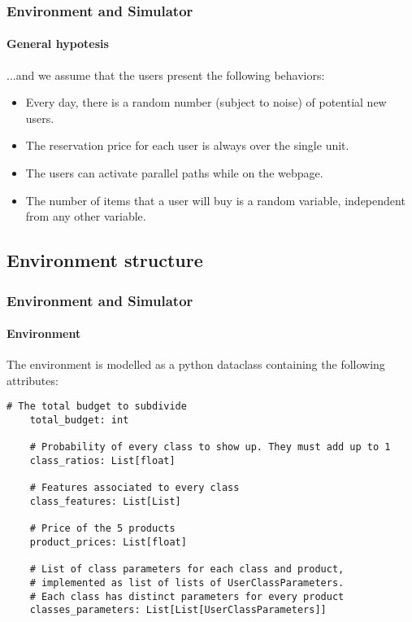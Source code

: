 \documentclass[11pt]{beamer}
\begin{document}

\begin{frame}

\frametitle{Environment and Simulator}
\framesubtitle{General hypotesis}

...and we assume that the users present the following behaviors:
\begin{itemize}[label={-}]
    \item Every day, there is a random number (subject to noise) of potential new users.
    \item The reservation price for each user is always over the single unit.
    \item The users can activate parallel paths while on the webpage.
    \item The number of items that a user will buy is a random variable, independent from any other variable.
\end{itemize}


\end{frame}


\subsection{Environment structure}


\begin{frame}[fragile]

\frametitle{Environment and Simulator}
\framesubtitle{Environment}

The environment is modelled as a python dataclass containing the following attributes:

\begin{lstlisting}[style=Python, basicstyle=\tiny, numbers=none, framexrightmargin=-20pt]
    # The total budget to subdivide
    total_budget: int

    # Probability of every class to show up. They must add up to 1
    class_ratios: List[float]

    # Features associated to every class
    class_features: List[List]

    # Price of the 5 products
    product_prices: List[float]

    # List of class parameters for each class and product,
    # implemented as list of lists of UserClassParameters.
    # Each class has distinct parameters for every product
    classes_parameters: List[List[UserClassParameters]]
\end{lstlisting}

\end{frame}
\end{document}
